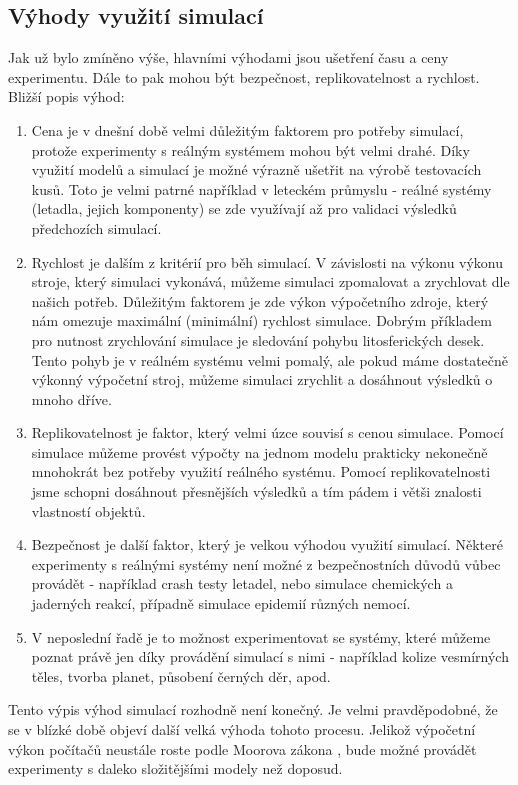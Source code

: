 \subsection{Výhody využití simulací}
Jak už bylo zmíněno výše, hlavními výhodami jsou ušetření času a ceny experimentu. Dále to pak mohou být bezpečnost, replikovatelnost a rychlost. Bližší popis výhod:

\begin{enumerate}
    \item Cena je v dnešní době velmi důležitým faktorem pro potřeby simulací, protože experimenty s reálným systémem mohou být velmi drahé. Díky využití modelů a simulací je možné výrazně ušetřit na výrobě testovacích kusů. Toto je velmi patrné například v leteckém průmyslu - reálné systémy (letadla, jejich komponenty) se zde využívají až pro validaci výsledků předchozích simulací. 
    \item Rychlost je dalším z kritérií pro běh simulací. V závislosti na výkonu výkonu stroje, který simulaci vykonává, můžeme simulaci zpomalovat a zrychlovat dle našich potřeb. Důležitým faktorem je zde výkon výpočetního zdroje, který nám omezuje maximální (minimální) rychlost simulace. Dobrým příkladem pro nutnost zrychlování simulace je sledování pohybu litosferických desek. Tento pohyb je v reálném systému velmi pomalý, ale pokud máme dostatečně výkonný výpočetní stroj, můžeme simulaci zrychlit a dosáhnout výsledků o mnoho dříve. 
    \item Replikovatelnost je faktor, který velmi úzce souvisí s cenou simulace. Pomocí simulace můžeme provést výpočty na jednom modelu prakticky nekonečně mnohokrát bez potřeby využití reálného systému. Pomocí replikovatelnosti jsme schopni dosáhnout přesnějších výsledků a tím pádem i větši znalosti vlastností objektů.
    \item Bezpečnost je další faktor, který je velkou výhodou využití simulací. Některé experimenty s reálnými systémy není možné z bezpečnostních důvodů vůbec provádět - například crash testy letadel, nebo simulace chemických a jaderných reakcí, případně simulace epidemií různých nemocí.
    \item V neposlední řadě je to možnost experimentovat se systémy, které můžeme poznat právě jen díky provádění simulací s nimi - například kolize vesmírných těles, tvorba planet, působení černých děr, apod.
\end{enumerate}

Tento výpis výhod simulací rozhodně není konečný. Je velmi pravděpodobné, že se v blízké době objeví další velká výhoda tohoto procesu. Jelikož výpočetní výkon počítačů neustále roste podle Moorova zákona \cite{Schaller1997}, bude možné provádět experimenty s daleko složitějšími modely než doposud. 

